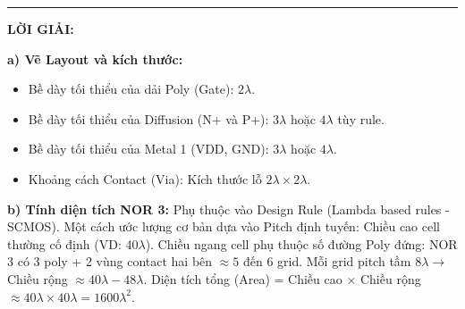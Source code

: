 \documentclass[12pt,a4paper]{article}
\begin{document}
\hrule\vspace{0.5cm}
\textbf{LỜI GIẢI:}

\textbf{a) Vẽ Layout và kích thước:}
\begin{itemize}
    \item Bề dày tối thiểu của dải Poly (Gate): $2\lambda$.
    \item Bề dày tối thiểu của Diffusion (N+ và P+): $3\lambda$ hoặc $4\lambda$ tùy rule.
    \item Bề dày tối thiểu của Metal 1 (VDD, GND): $3\lambda$ hoặc $4\lambda$.
    \item Khoảng cách Contact (Via): Kích thước lỗ $2\lambda \times 2\lambda$.
\end{itemize}

\textbf{b) Tính diện tích NOR 3:}
Phụ thuộc vào Design Rule (Lambda based rules - SCMOS). 
Một cách ước lượng cơ bản dựa vào Pitch định tuyến:
Chiều cao cell thường cố định (VD: $40\lambda$).
Chiều ngang cell phụ thuộc số đường Poly đứng: NOR 3 có 3 poly + 2 vùng contact hai bên $\approx 5$ đến 6 grid. Mỗi grid pitch tầm $8\lambda \rightarrow$ Chiều rộng $\approx 40\lambda - 48\lambda$.
Diện tích tổng (Area) = Chiều cao $\times$ Chiều rộng $\approx 40\lambda \times 40\lambda = 1600 \lambda^2$. 
\end{document}
